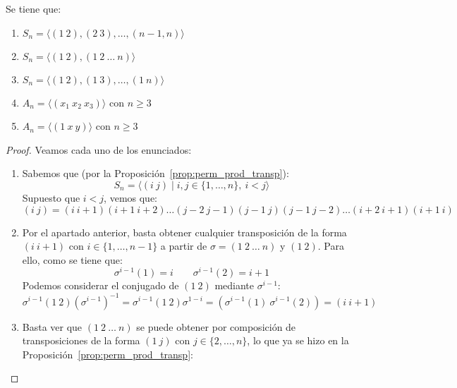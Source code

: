 \begin{prop}\label{prop:generadores_grupos}
    Se tiene que:
    \begin{enumerate}[label=(\alph*)]
        \item $S_n = \langle (1\ 2),(2\ 3),\ldots,(n-1, n) \rangle $
        \item $S_n = \langle (1\ 2), (1\ 2\ \ldots\ n) \rangle $
        \item $S_n = \langle (1\ 2),(1\ 3), \ldots, (1\ n)\rangle $
        \item $A_n = \langle (x_1\ x_2\ x_3) \rangle $ con $n\geq 3$
        \item $A_n = \langle (1\ x\ y) \rangle $ con $n\geq 3$
    \end{enumerate}
    \begin{proof}
        Veamos cada uno de los enunciados:
        \begin{enumerate}[label=(\alph*)]
            \item Sabemos que (por la Proposición~\ref{prop:perm_prod_transp}):
                \begin{equation*}
                    S_n = \langle (i\ j) \mid i,j \in \{1,\ldots,n\},\ i<j \rangle 
                \end{equation*}
                Supuesto que $i<j$, vemos que:
                \begin{equation*}
                    (i\ j) = (i\ i+1)(i+1\ i+2) \ldots (j-2\ j-1)(j-1\ j)(j-1\ j-2) \ldots (i+2\ i+1)(i+1\ i)
                \end{equation*}
            \item Por el apartado anterior, basta obtener cualquier transposición de la forma $(i\ i+1)$ con $i \in \{1,\ldots,n-1\}$ a partir de $\sigma=(1\ 2\ \ldots\ n)$ y $(1\ 2)$. Para ello, como se tiene que:
                \begin{equation*}
                    \sigma^{i-1}(1) = i \qquad \sigma^{i-1}(2) = i+1 
                \end{equation*}
                Podemos considerar el conjugado de $(1\ 2)$ mediante $\sigma^{i-1}$:
                \begin{equation*}
                    \sigma^{i-1}(1\ 2){(\sigma^{i-1})}^{-1} = \sigma^{i-1}(1\ 2)\sigma^{1-i} = (\sigma^{i-1}(1)\ \sigma^{i-1}(2)) = (i\ i+1)
                \end{equation*}
            \item Basta ver que $(1\ 2\ \ldots\ n)$ se puede obtener por composición de transposiciones de la forma $(1\ j)$ con $j \in \{2,\ldots,n\}$, lo que ya se hizo en la Proposición~\ref{prop:perm_prod_transp}:

\end{enumerate}
\end{proof}
\end{prop}
